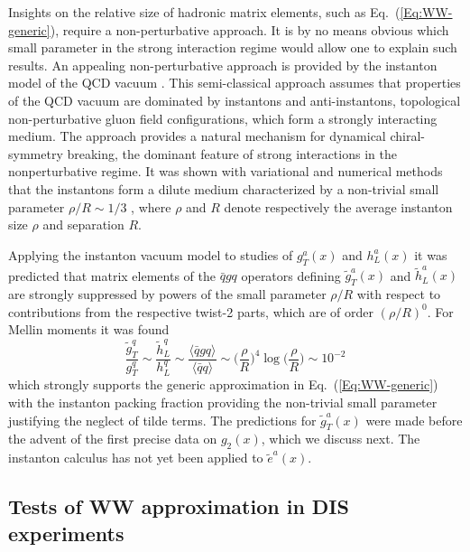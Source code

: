\documentclass[a4paper,11pt]{article}
\newcommand{\be}{\begin{equation}}
\newcommand{\ee}{\end{equation}}
\newcommand{\la}{\langle}
\newcommand{\ra}{\rangle}
\begin{document}
Insights on the relative size of hadronic matrix elements, such as 
Eq.~(\ref{Eq:WW-generic}), require a non-perturbative approach. It is 
by no means obvious which small parameter in the strong interaction 
regime would allow one to explain such results. An appealing 
non-perturbative approach is provided by the instanton model of 
the QCD vacuum \cite{Shuryak:1981ff,Diakonov:1983hh,Diakonov:1995qy}.
This semi-classical approach assumes that properties of the QCD vacuum 
are dominated by instantons and anti-instantons, topological non-perturbative 
gluon field configurations, which form a strongly interacting medium.
The approach provides a natural mechanism for dynamical chiral-symmetry 
breaking, the dominant feature of strong interactions in the nonperturbative
regime. It was shown with variational and numerical methods that the 
instantons form a dilute medium characterized by a non-trivial small parameter
$\rho/R\sim1/3$ \cite{Shuryak:1981ff,Diakonov:1983hh,Diakonov:1995qy},
where $\rho$ and $R$ denote respectively the average instanton size $\rho$
and separation $R$.

Applying the instanton vacuum model to studies of $g_T^a(x)$ and $h_L^a(x)$
it was predicted that matrix elements of the $\bar{q}gq$ operators defining 
$\tilde{g}_T^a(x)$ \cite{Balla:1997hf} and $\tilde{h}_L^a(x)$ 
\cite{Dressler:1999hc} are strongly suppressed by powers of the small
parameter $\rho/R$ with respect to contributions from the 
respective twist-2 parts, which are of order $(\rho/R)^0$. 
For Mellin moments it was found \cite{Balla:1997hf,Dressler:1999hc}
\be\label{Eq:WW-instanoton}
	\frac{\tilde{g}_T^q}{g_T^q} \sim \frac{\tilde{h}_L^q}{h_L^q} 
	\sim \frac{\la\bar{q}gq\ra}{\la\bar{q}q\ra} \sim 
	\biggl(\frac{\rho}{R}\biggr)^{\!4} \log\biggl(\frac{\rho}{R}\biggr)
	\sim 10^{-2}
\ee
which strongly supports the generic approximation
in Eq.~(\ref{Eq:WW-generic}) with the instanton packing fraction providing 
the non-trivial small parameter justifying the neglect of tilde terms. 
The predictions for $\tilde{g}_T^a(x)$ \cite{Balla:1997hf}
were made before the advent of the first precise data on $g_2(x)$,
which we discuss next.
The instanton calculus has not yet been applied to $\tilde{e}^a(x)$.


%
\subsection{Tests of WW approximation in DIS experiments}
\label{Sec-3.4:WW-classic-experiment}
\end{document}
